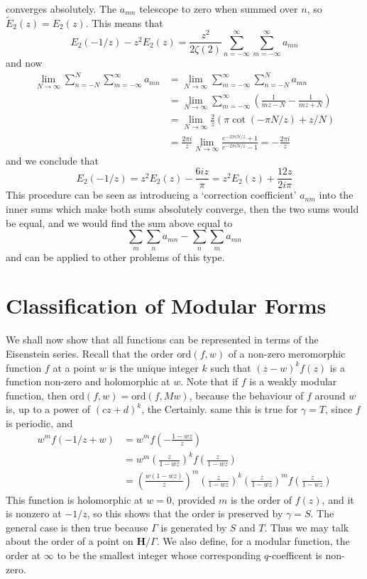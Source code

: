 %
converges absolutely. The $a_{mn}$ telescope to zero when summed over $n$, so $\tilde{E}_2(z) = E_2(z)$. This means that
%
\[ E_2(-1/z) - z^2E_2(z) = \frac{z^2}{2 \zeta(2)} \sum_{n = -\infty}^\infty \sum_{m = -\infty}^\infty a_{mn} \]
%
and now
%
\begin{align*}
    \lim_{N \to \infty} \sum_{n = -N}^N \sum_{m = -\infty}^\infty a_{mn} &= \lim_{N \to \infty} \sum_{m = -\infty}^\infty \sum_{n = -N}^N a_{mn}\\
    &= \lim_{N \to \infty} \sum_{m = -\infty}^\infty \left( \frac{1}{mz - N} - \frac{1}{mz + N} \right)\\
    &= \lim_{N \to \infty} \frac{2}{z} \left( \pi \cot(- \pi N/z) + z/N \right)\\
    &= \frac{2 \pi i}{z} \lim_{N \to \infty} \frac{e^{-2 \pi i N/z} + 1}{e^{- 2 \pi i N/z} - 1} = -\frac{2 \pi i}{z}
\end{align*}
%
and we conclude that
%
\[ E_2(-1/z) = z^2 E_2(z) - \frac{6 i z}{\pi} = z^2 E_2(z) + \frac{12z}{2 i \pi} \]
%
This procedure can be seen as introducing a `correction coefficient' $a_{nm}$ into the inner sums which make both sums absolutely converge, then the two sums would be equal, and we would find the sum above equal to
%
\[ \sum_m \sum_n a_{mn} - \sum_n \sum_m a_{mn} \]
%
and can be applied to other problems of this type.

\section{Classification of Modular Forms}

We shall now show that all functions can be represented in terms of the Eisenstein series. Recall that the order $\text{ord}(f,w)$ of a non-zero meromorphic function $f$ at a point $w$ is the unique integer $k$ such that $(z - w)^k f(z)$ is a function non-zero and holomorphic at $w$. Note that if $f$ is a weakly modular function, then $\text{ord}(f,w) = \text{ord}(f, Mw)$, because the behaviour of $f$ around $w$ is, up to a power of $(cz + d)^k$, the Certainly. same this is true for $\gamma = T$, since $f$ is periodic, and
%
\begin{align*}
    w^m f(-1/z + w) &= w^m f\left( -\frac{1-wz}{z} \right)\\
    &= w^m \left( \frac{z}{1 - wz} \right)^k f \left( \frac{z}{1 - wz} \right)\\
    &= \left( \frac{w (1 - wz)}{z} \right)^m \left( \frac{z}{1 - wz} \right)^k \left( \frac{z}{1 - wz} \right)^m f\left( \frac{z}{1 - wz} \right)
\end{align*}
%
This function is holomorphic at $w = 0$, provided $m$ is the order of $f(z)$, and it is nonzero at $-1/z$, so this shows that the order is preserved by $\gamma = S$. The general case is then true because $\Gamma$ is generated by $S$ and $T$. Thus we may talk about the order of a point on $\mathbf{H} / \Gamma$. We also define, for a modular function, the order at $\infty$ to be the smallest integer whose corresponding $q$-coefficent is non-zero.

